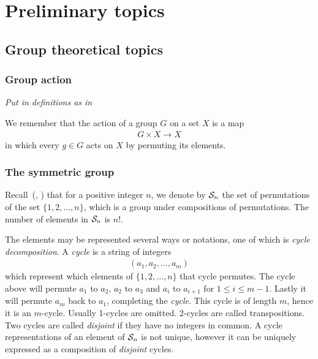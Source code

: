 \clearpage{\thispagestyle{empty}}
\section{Preliminary topics}

\subsection{Group theoretical topics}

\subsubsection{Group action}

\textit{Put in definitions as in \cite{DummitFoote}}

We remember that the action of a group $G$ on a set $X$ is a map
\begin{align*}
	G \times X \rightarrow X
\end{align*}
in which every $g \in G$ acts on $X$ by permuting its elements.

%

\subsubsection{The symmetric group}

Recall~(\cite[1.3.]{DummitFoote}, \cite[1.1]{Sagan}) that for a positive integer $n$, we denote by $\mathcal{S}_n$ the set of permutations of the set $\{1, 2, \dots, n\}$, which is a group under compositions of permutations. The number of elements in $\mathcal{S}_n$ is $n!$.

The elements may be represented several ways or notations, one of which is \textit{cycle decomposition}. A \textit{cycle} is a string of integers \begin{align*}
	(a_1, a_2, \dots, a_m)
\end{align*} which represent which elements of $\{1,2, \dots, n\}$ that cycle permutes. The cycle above will permute $a_1$ to $a_2$, $a_2$ to $a_3$ and $a_{i}$ to $a_{i+1}$ for $1 \leq i \leq m-1$. Lastly it will permute $a_m$ back to $a_1$, completing the \textit{cycle}. This cycle is of length $m$, hence it is an $m$-cycle. Usually 1-cycles are omitted. 2-cycles are called transpositions. Two cycles are called \textit{disjoint} if they have no integers in common. A cycle representations of an element of $\mathcal{S}_n$ is not unique, however it can be uniquely expressed as a composition of \textit{disjoint} cycles.

